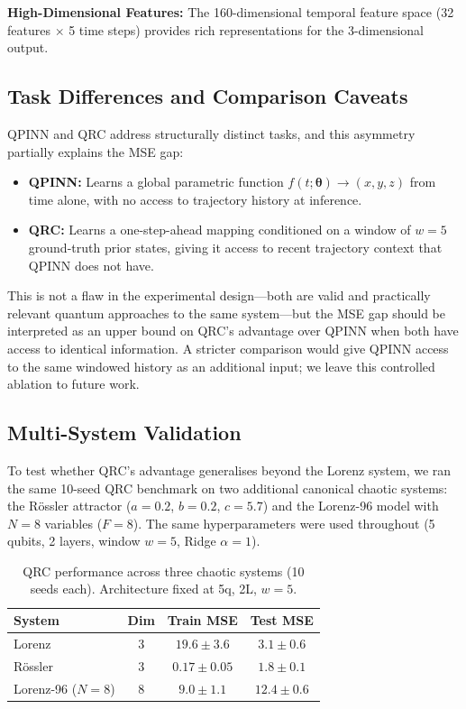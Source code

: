 \documentclass[11pt,a4paper]{article}
\begin{document}
\textbf{High-Dimensional Features:} The 160-dimensional temporal feature space (32 features $\times$ 5 time steps) provides rich representations for the 3-dimensional output.

\subsection{Task Differences and Comparison Caveats}
\label{sec:task_diff}

QPINN and QRC address structurally distinct tasks, and this asymmetry
partially explains the MSE gap:
\begin{itemize}
    \item \textbf{QPINN:} Learns a global parametric function $f(t; \boldsymbol{\theta}) \rightarrow (x, y, z)$ from time alone, with no access to trajectory history at inference.
    \item \textbf{QRC:} Learns a one-step-ahead mapping conditioned on a window of $w=5$ ground-truth prior states, giving it access to recent trajectory context that QPINN does not have.
\end{itemize}

This is not a flaw in the experimental design---both are valid and practically
relevant quantum approaches to the same system---but the MSE gap should be
interpreted as an upper bound on QRC's advantage over QPINN when both have
access to identical information.
A stricter comparison would give QPINN access to the same windowed history as
an additional input; we leave this controlled ablation to future work.

\subsection{Multi-System Validation}
\label{sec:multisystem}

To test whether QRC's advantage generalises beyond the Lorenz system, we ran
the same 10-seed QRC benchmark on two additional canonical chaotic systems:
the R\"{o}ssler attractor ($a=0.2$, $b=0.2$, $c=5.7$) and the Lorenz-96
model with $N=8$ variables ($F=8$).
The same hyperparameters were used throughout (5 qubits, 2 layers, window
$w=5$, Ridge $\alpha=1$).

\begin{table}[h]
    \centering
    \caption{QRC performance across three chaotic systems (10 seeds each).
             Architecture fixed at 5q, 2L, $w=5$.}
    \label{tab:multisystem}
    \begin{tabular}{lccc}
        \toprule
        \textbf{System} & \textbf{Dim} & \textbf{Train MSE} & \textbf{Test MSE} \\
        \midrule
        Lorenz          & 3  & $19.6 \pm 3.6$ & $3.1 \pm 0.6$ \\
        R\"{o}ssler     & 3  & $0.17 \pm 0.05$ & $1.8 \pm 0.1$ \\
        Lorenz-96 ($N=8$) & 8 & $9.0 \pm 1.1$ & $12.4 \pm 0.6$ \\
        \bottomrule
    \end{tabular}
\end{table}
\end{document}
